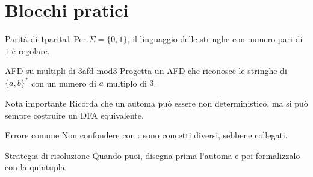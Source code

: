 \section{Blocchi pratici}

\begin{esempio}{Parità di $1$}{parita1}
Per $\Sigma=\{0,1\}$, il linguaggio delle stringhe con numero pari di $1$ è regolare.
\end{esempio}

\begin{esercizio}{AFD su multipli di 3}{afd-mod3}
Progetta un AFD che riconosce le stringhe di $\{a,b\}^*$ con un numero di $a$ multiplo di $3$.
\end{esercizio}

\begin{nota}{Nota importante}
Ricorda che un automa può essere non deterministico, ma si può sempre costruire un DFA equivalente.
\end{nota}

\begin{attenzione}{Errore comune}
Non confondere  con :
sono concetti diversi, sebbene collegati.
\end{attenzione}

\begin{suggerimento}{Strategia di risoluzione}
Quando puoi, disegna prima l’automa e poi formalizzalo con la quintupla.
\end{suggerimento}

\clearpage
